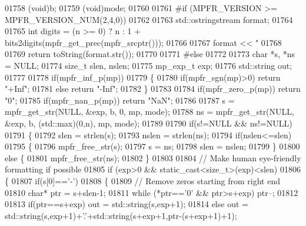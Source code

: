\begin{DoxyCode}
01758     (void)b;
01759     (void)mode;
01760 
01761 \textcolor{preprocessor}{#if (MPFR\_VERSION >= MPFR\_VERSION\_NUM(2,4,0))}
01762 
01763     std::ostringstream format;
01764 
01765     \textcolor{keywordtype}{int} digits = (n >= 0) ? n : 1 + bits2digits(mpfr\_get\_prec(mpfr\_srcptr()));
01766 
01767     format << \textcolor{stringliteral}{"%
01768 
01769     \textcolor{keywordflow}{return} toString(format.str());
01770 
01771 \textcolor{preprocessor}{#else}
01772 
01773     \textcolor{keywordtype}{char} *s, *ns = NULL;
01774     \textcolor{keywordtype}{size\_t} slen, nslen;
01775     mp\_exp\_t exp;
01776     std::string out;
01777 
01778     \textcolor{keywordflow}{if}(mpfr\_inf\_p(mp))
01779     \{
01780         \textcolor{keywordflow}{if}(mpfr\_sgn(mp)>0) \textcolor{keywordflow}{return} \textcolor{stringliteral}{"+Inf"};
01781         \textcolor{keywordflow}{else}               \textcolor{keywordflow}{return} \textcolor{stringliteral}{"-Inf"};
01782     \}
01783 
01784     \textcolor{keywordflow}{if}(mpfr\_zero\_p(mp)) \textcolor{keywordflow}{return} \textcolor{stringliteral}{"0"};
01785     \textcolor{keywordflow}{if}(mpfr\_nan\_p(mp))  \textcolor{keywordflow}{return} \textcolor{stringliteral}{"NaN"};
01786 
01787     s  = mpfr\_get\_str(NULL, &exp, b, 0, mp, mode);
01788     ns = mpfr\_get\_str(NULL, &exp, b, (std::max)(0,n), mp, mode);
01789 
01790     \textcolor{keywordflow}{if}(s!=NULL && ns!=NULL)
01791     \{
01792         slen  = strlen(s);
01793         nslen = strlen(ns);
01794         \textcolor{keywordflow}{if}(nslen<=slen)
01795         \{
01796             mpfr\_free\_str(s);
01797             s = ns;
01798             slen = nslen;
01799         \}
01800         \textcolor{keywordflow}{else} \{
01801             mpfr\_free\_str(ns);
01802         \}
01803 
01804         \textcolor{comment}{// Make human eye-friendly formatting if possible}
01805         \textcolor{keywordflow}{if} (exp>0 && static\_cast<size\_t>(exp)<slen)
01806         \{
01807             \textcolor{keywordflow}{if}(s[0]==\textcolor{charliteral}{'-'})
01808             \{
01809                 \textcolor{comment}{// Remove zeros starting from right end}
01810                 \textcolor{keywordtype}{char}* ptr = s+slen-1;
01811                 \textcolor{keywordflow}{while} (*ptr==\textcolor{charliteral}{'0'} && ptr>s+exp) ptr--;
01812 
01813                 \textcolor{keywordflow}{if}(ptr==s+exp) out = std::string(s,exp+1);
01814                 \textcolor{keywordflow}{else}           out = std::string(s,exp+1)+\textcolor{charliteral}{'.'}+std::string(s+exp+1,ptr-(s+exp+1)+1);
}
\end{DoxyCode}
